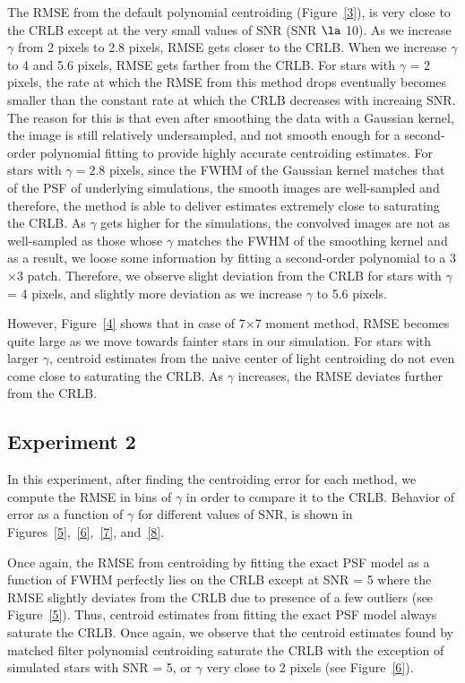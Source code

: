 \documentclass[12pt, preprint]{aastex}
\begin{document}
The RMSE from the default polynomial centroiding (Figure~\ref{3}),
is very close to the CRLB except at the very small values of SNR (SNR $\la$ 10).
As we increase $\gamma$ from 2 pixels to 2.8 pixels, RMSE gets closer
to the CRLB. When we increase $\gamma$ to
4 and 5.6 pixels, RMSE gets farther from the CRLB. For stars with $\gamma$ = 2 pixels, 
the rate at which the RMSE from this method drops
eventually becomes smaller than the constant rate at which the CRLB
decreases with increaing SNR. The reason for this is that even after smoothing
the data with a Gaussian kernel, the image is still relatively undersampled, and not smooth enough
for a second-order polynomial fitting to provide highly accurate centroiding estimates.
For stars with $\gamma=2.8$ pixels, since the FWHM of the Gaussian kernel matches that 
of the PSF of underlying simulations, the smooth images are well-sampled and therefore, 
the method is able to deliver estimates extremely close to saturating the CRLB. As $\gamma$
gets higher for the simulations, the convolved images are not as well-sampled as those 
whose $\gamma$ matches the FWHM of the smoothing kernel and as a result, we loose
some information by fitting a second-order polynomial to a 3$\times$3 patch. Therefore,
 we observe slight deviation from the CRLB for stars with $\gamma$ = 4 pixels, and 
slightly more deviation as we increase $\gamma$ to 5.6 pixels.

However, Figure~\ref{4} shows that in case of 7$\times$7 moment method, RMSE becomes
quite large as we move towards fainter stars in our simulation.
For stars with larger $\gamma$, centroid estimates from the naive center of light 
centroiding do not even come close to saturating the CRLB. As $\gamma$ increases, the 
RMSE deviates further from the CRLB.

\subsection{Experiment 2}

In this experiment, after finding the centroiding error for each method, we
compute the RMSE in bins of $\gamma$ in order to compare it to the CRLB. 
Behavior of error as a function of $\gamma$ for different values of SNR,
is shown in Figures~\ref{5},~\ref{6},~\ref{7}, and~\ref{8}. 
 
Once again, the RMSE from centroiding by fitting the exact PSF model as a function of FWHM
perfectly lies on the CRLB except at SNR = 5 where the RMSE slightly deviates
from the CRLB due to presence of a few outliers (see Figure~\ref{5}). 
Thus, centroid estimates from fitting
the exact PSF model always saturate the CRLB. Once again, we observe that the centroid
estimates found by matched filter polynomial centroiding saturate the CRLB with the
exception of simulated stars with SNR = 5, or $\gamma$ very close to 2 pixels (see Figure~\ref{6}).
\end{document}
